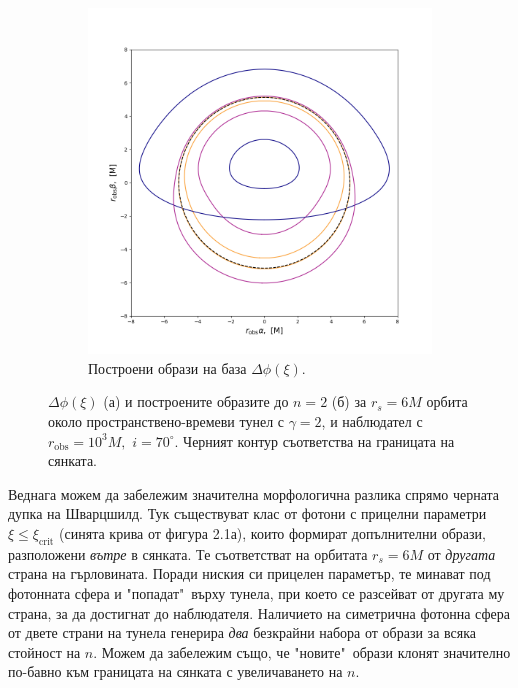 \documentclass[12pt]{article}
\numberwithin{equation}{section}
\numberwithin{figure}{section}
\begin{document}
\begin{figure}[h]
\begin{subfigure}{6cm}
			\includegraphics[scale = 0.3]{Section_6_Morphology_of_the images_of_horizonless_spacetimes/WH_70_deg_r6_gamma_2.png}
			\caption{Построени образи на база $\Delta\phi(\xi)$.\newline} \label{fig:1b}
		\end{subfigure}
		\caption[$\Delta\phi(\xi)$ и образите за $r_s=6M$ орбита около пространствено-времеви тунел до $n = 2$.]{\small $\Delta\phi(\xi)$ (а) и построените образите до $n = 2$ (б) за $r_s=6M$ орбита около пространствено-времеви тунел с $\gamma = 2$, и наблюдател с $r_\text{obs} = 10^3M,\,\,i = 70^\circ$. Черният контур съответства на границата на сянката.} 
		\label{WH_r6_orbit}
	\end{figure}
	
	\lfoot{}
	Веднага можем да забележим значителна морфологична разлика спрямо черната дупка на Шварцшилд. Тук съществуват клас от фотони с прицелни параметри $\xi \le \xi_\text{crit}$ (синята крива от фигура 2.1а), които формират допълнителни образи, разположени \emph{вътре} в сянката. Те съответстват на орбитата $r_s = 6M$ от \emph{другата} страна на гърловината. Поради ниския си прицелен параметър, те минават под фотонната сфера и "попадат"$\,$ върху тунела, при което се разсейват от другата му страна, за да достигнат до наблюдателя. Наличието на симетрична фотонна сфера от двете страни на тунела генерира \emph{два} безкрайни набора от образи за всяка стойност на $n$. Можем да забележим също, че "новите"$\,$ образи клонят значително по-бавно към границата на сянката с увеличаването на $n$.\\
	
\end{document}
